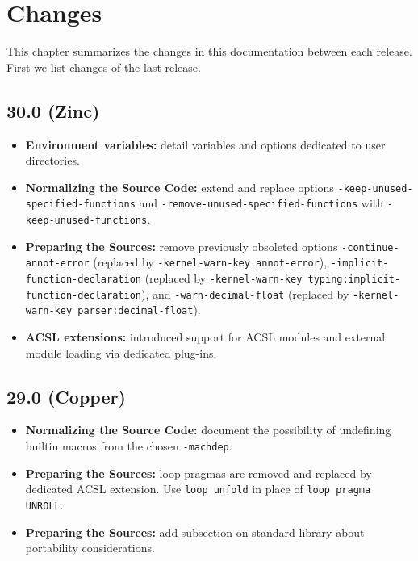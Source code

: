 \chapter{Changes}\label{chap:changes}

This chapter summarizes the changes in this documentation between each \FramaC
release. First we list changes of the last release.


\section*{30.0 (Zinc)}
\begin{itemize}
\item \textbf{Environment variables:} detail variables and options dedicated to
  user directories.
\item \textbf{Normalizing the Source Code:} extend and replace options
  \texttt{-keep-unused-specified-functions} and
  \texttt{-remove-unused-specified-functions} with
  \texttt{-keep-unused-functions}.
\item \textbf{Preparing the Sources:} remove previously obsoleted
  options \texttt{-continue-annot-error} (replaced by
  \texttt{-kernel-warn-key annot-error}),
  \texttt{-implicit-function-declaration} (replaced by
  \texttt{-kernel-warn-key typing:implicit-function-declaration}),
  and \texttt{-warn-decimal-float} (replaced by
  \texttt{-kernel-warn-key parser:decimal-float}).
\item \textbf{ACSL extensions:} introduced support for ACSL modules
  and external module loading via dedicated plug-ins.
\end{itemize}

\section*{29.0 (Copper)}
\begin{itemize}
\item \textbf{Normalizing the Source Code:} document the possibility of
  undefining builtin macros from the chosen \texttt{-machdep}.
\item \textbf{Preparing the Sources:} loop pragmas are removed and replaced
  by dedicated ACSL extension.
  Use \verb+loop unfold+ in place of \verb+loop pragma UNROLL+.
\item \textbf{Preparing the Sources:} add subsection on standard library about
  portability considerations.
\end{itemize}

